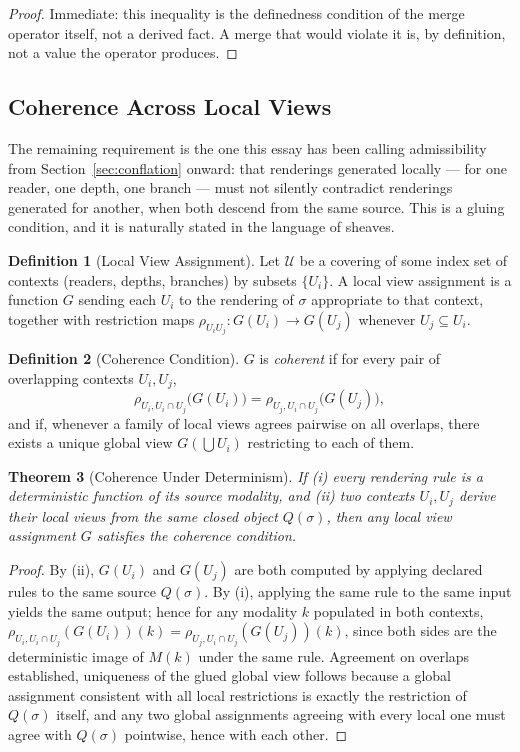 \documentclass[11pt]{article}
\newtheorem{theorem}{Theorem}[section]
\theoremstyle{definition}
\newtheorem{definition}[theorem]{Definition}
\begin{document}
\begin{proof}
Immediate: this inequality is the definedness condition of the merge operator itself, not a derived fact. A merge that would violate it is, by definition, not a value the operator produces.
\end{proof}

\subsection{Coherence Across Local Views}

The remaining requirement is the one this essay has been calling admissibility from Section~\ref{sec:conflation} onward: that renderings generated locally --- for one reader, one depth, one branch --- must not silently contradict renderings generated for another, when both descend from the same source. This is a gluing condition, and it is naturally stated in the language of sheaves.

\begin{definition}[Local View Assignment]
\label{def:local-view}
Let $\mathcal{U}$ be a covering of some index set of contexts (readers, depths, branches) by subsets $\{U_i\}$. A local view assignment is a function $G$ sending each $U_i$ to the rendering of $\sigma$ appropriate to that context, together with restriction maps $\rho_{U_i U_j} : G(U_i) \to G(U_j)$ whenever $U_j \subseteq U_i$.
\end{definition}

\begin{definition}[Coherence Condition]
\label{def:coherence-condition}
$G$ is \emph{coherent} if for every pair of overlapping contexts $U_i, U_j$,
\[
\rho_{U_i, U_i \cap U_j}\bigl(G(U_i)\bigr) = \rho_{U_j, U_i \cap U_j}\bigl(G(U_j)\bigr),
\]
and if, whenever a family of local views agrees pairwise on all overlaps, there exists a unique global view $G(\bigcup U_i)$ restricting to each of them.
\end{definition}

\begin{theorem}[Coherence Under Determinism]
\label{thm:coherence}
If (i) every rendering rule is a deterministic function of its source modality, and (ii) two contexts $U_i, U_j$ derive their local views from the same closed object $Q(\sigma)$, then any local view assignment $G$ satisfies the coherence condition.
\end{theorem}

\begin{proof}
By (ii), $G(U_i)$ and $G(U_j)$ are both computed by applying declared rules to the same source $Q(\sigma)$. By (i), applying the same rule to the same input yields the same output; hence for any modality $k$ populated in both contexts, $\rho_{U_i, U_i\cap U_j}(G(U_i))(k) = \rho_{U_j, U_i \cap U_j}(G(U_j))(k)$, since both sides are the deterministic image of $M(k)$ under the same rule. Agreement on overlaps established, uniqueness of the glued global view follows because a global assignment consistent with all local restrictions is exactly the restriction of $Q(\sigma)$ itself, and any two global assignments agreeing with every local one must agree with $Q(\sigma)$ pointwise, hence with each other.
\end{proof}
\end{document}
